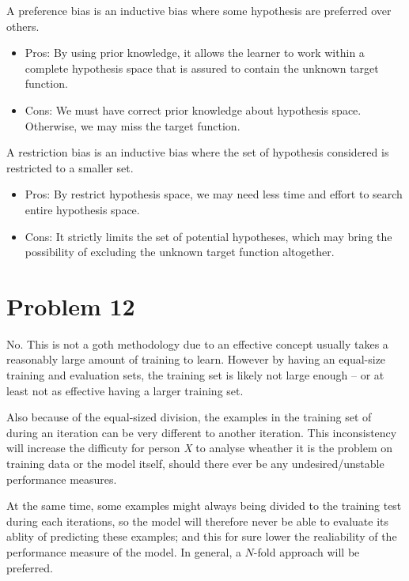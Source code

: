 \documentclass[12pt]{article}
\begin{document}
A preference bias is an inductive bias where some hypothesis are preferred over others.

\begin{itemize}
    \item Pros: By using prior knowledge, it allows the learner to work within a complete hypothesis space that is assured to contain the unknown target function.
    \item Cons: We must have correct prior knowledge about hypothesis space. Otherwise, we may miss the target function.
\end{itemize}



\noindent A restriction bias is an inductive bias where the set of hypothesis considered is restricted to a smaller set.

\begin{itemize}
    \item Pros: By restrict hypothesis space, we may need less time and effort to search entire hypothesis space.
    \item Cons: It strictly limits the set of potential hypotheses, which may bring the possibility of excluding the unknown target function altogether.
\end{itemize}




\section{Problem 12}

No. This is not a goth methodology due to an effective concept usually takes a reasonably large amount of training to learn. However by having an equal-size training and evaluation sets, the training set is likely not large enough -- or at least not as effective having a larger training set.\newline

Also because of the equal-sized division, the examples in the training set of during an iteration can be very different to another iteration. This inconsistency will increase the difficuty for person \textit{X} to analyse wheather it is the problem on training data or the model itself, should there ever be any undesired/unstable performance measures.

At the same time, some examples might always being divided to the training test during each iterations, so the model will therefore never be able to evaluate its ablity of predicting these examples; and this for sure lower the realiability of the performance measure of the model. In general, a $N$-fold approach will be preferred.
\end{document}
